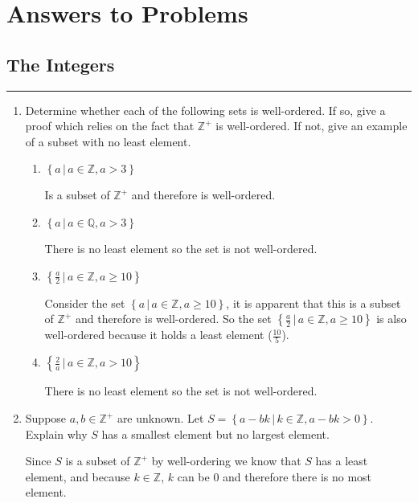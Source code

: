 \documentclass[class=article, crop=false]{standalone}
\def\integers{{\mathbb Z}}
\def\rationals{{\mathbb Q}}
\begin{document}
	
\section{Answers to Problems}

\subsection{The Integers}
\hfill {}
\rule{\textwidth}{1pt}
\begin{enumerate}
\item
  Determine whether each of the following sets is well-ordered.  If
  so, give a proof which relies on the fact that $\integers^+$ is well-ordered.
  If not, give an example of a subset with no least element.
  \begin{enumerate}
  \item
	$\left\{a\,\big|\, a\in\integers,a>3\right\}$

	Is a subset of $\integers^+$ and therefore is well-ordered.
  \item
	$\left\{a\,\big|\, a\in\rationals,a>3\right\}$

	There is no least element so the set is not well-ordered.
  \item
	$\left\{\frac a2\,\big|\, a\in\integers,a\geq 10\right\}$

	Consider the set $\left\{a\,\big|\, a\in\integers,a\geq 10\right\}$, it is apparent that this is a subset of $\integers^+$ and therefore is well-ordered.
	So the set $\left\{\frac a2\,\big|\, a\in\integers,a\geq 10\right\}$ is also well-ordered because it holds a least element ($\frac{10}{5}$).
  \item
	$\left\{\frac 2a\,\big|\, a\in\integers,a>10\right\}$

	There is no least element so the set is not well-ordered.
  \end{enumerate}

\item
  Suppose $a,b\in\integers^+$ are unknown.  Let
  $S=\left\{a-bk\,\big|\, k\in\integers,a-bk>0\right\}$.
  Explain why $S$ has a smallest element but no largest element.

  Since $S$ is a subset of $\integers^+$ by well-ordering we know that $S$ has a least element, and because $k\in\integers$,
  $k$ can be $0$ and therefore there is no most element.


\end{enumerate}
\end{document}
